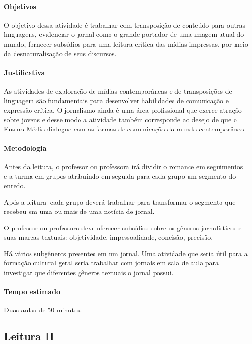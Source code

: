 \documentclass{article}
\begin{document}
\paragraph{Objetivos}
O objetivo dessa atividade é trabalhar com transposição de conteúdo para
outras linguagens, evidenciar o jornal como o grande portador de uma
imagem atual do mundo, fornecer subsídios para uma leitura crítica das
mídias impressas, por meio da desnaturalização de seus discursos.

\paragraph{Justificativa}
As atividades de exploração de mídias contemporâneas e de transposições
de linguagem são fundamentais para desenvolver habilidades de
comunicação e expressão crítica. O jornalismo ainda é uma área
profissional que exerce atração sobre jovens e desse modo a atividade
também corresponde ao desejo de que o Ensino Médio dialogue com as
formas de comunicação do mundo contemporâneo.

\paragraph{Metodologia}
Antes da leitura, o professor ou professora irá dividir o romance em
seguimentos e a turma em grupos atribuindo em seguida para cada grupo um
segmento do enredo.

Após a leitura, cada grupo deverá trabalhar para transformar o segmento
que recebeu em uma ou mais de uma notícia de jornal.

O professor ou professora deve oferecer subsídios sobre os gêneros
jornalísticos e suas marcas textuais: objetividade, impessoalidade,
concisão, precisão.

Há vários subgêneros presentes em um jornal. Uma atividade que seria
útil para a formação cultural geral seria trabalhar com jornais em sala
de aula para investigar que diferentes gêneros textuais o jornal possui.

\paragraph{Tempo estimado} Duas aulas de 50 minutos.

\subsection{Leitura II}

\end{document}
